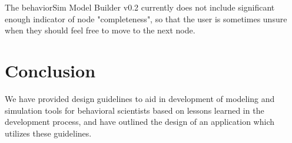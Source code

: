 \documentclass[conference]{IEEEtran}
\begin{document}
The behaviorSim Model Builder v0.2 currently does not include significant enough indicator of node "completeness", so that the user is sometimes unsure when they should feel free to move to the next node.




\section{Conclusion}
We have provided design guidelines to aid in development of modeling and simulation tools for behavioral scientists based on lessons learned in the development process, and have outlined the design of an application which utilizes these guidelines.



%
%



%
%
\end{document}
